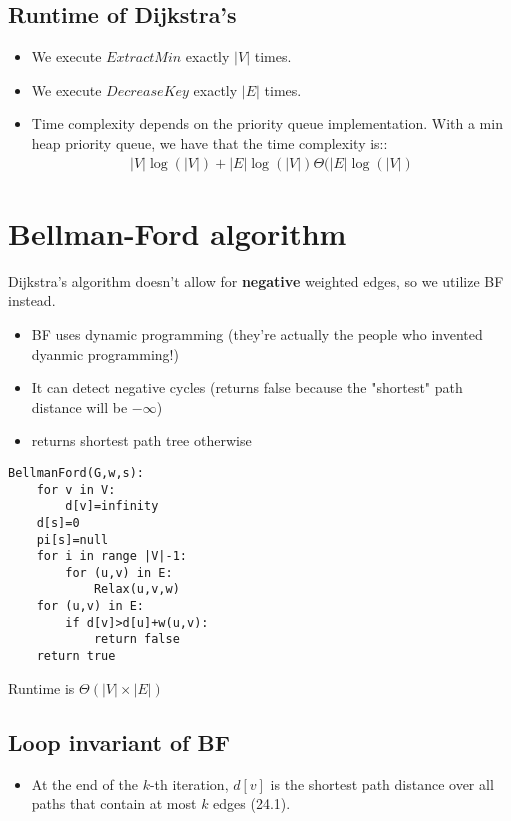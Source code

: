 \documentclass[12pt]{book}
\begin{document}
\subsection*{Runtime of Dijkstra's}

\begin{itemize}
    \item We execute $ExtractMin$ exactly $|V|$ times.
    \item We execute $DecreaseKey$ exactly $|E|$ times.
    \item Time complexity depends on the priority queue implementation. With a min heap priority queue, we have that the time complexity is::
    \begin{align*}
        |V|\log(|V|)+|E|\log(|V|)\Theta(|E|\log(|V|)
    \end{align*}
\end{itemize}

\section*{Bellman-Ford algorithm}
Dijkstra's algorithm doesn't allow for \textbf{negative} weighted edges, so we utilize BF instead.

\begin{itemize}
    \item BF uses dynamic programming (they're actually the people who invented dyanmic programming!)
    \item It can detect negative cycles (returns false because the "shortest" path distance will be $-\infty$)
    \item returns shortest path tree otherwise
\end{itemize}

\begin{lstlisting}
BellmanFord(G,w,s):
    for v in V:
        d[v]=infinity
    d[s]=0
    pi[s]=null
    for i in range |V|-1:
        for (u,v) in E:
            Relax(u,v,w)
    for (u,v) in E:
        if d[v]>d[u]+w(u,v):
            return false
    return true
\end{lstlisting}

Runtime is $\Theta(|V|\times|E|)$

\subsection*{Loop invariant of BF}

\begin{itemize}
    \item At the end of the $k$-th iteration, $d[v]$ is the shortest path distance over all paths that contain at most $k$ edges (24.1).
\end{itemize}
\end{document}

